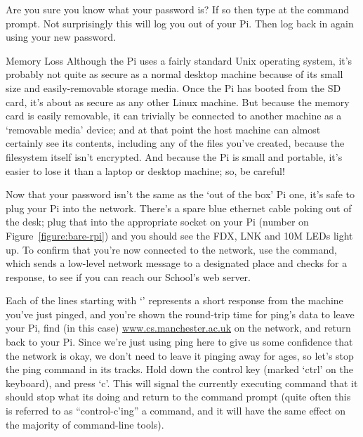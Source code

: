 Are you sure you know what your password is? If so then type  at the command prompt. Not surprisingly this will log you out of your Pi. Then log back in again using your new password. 

\begin{danger}{Memory Loss} 
Although the Pi uses a fairly standard Unix operating system, it's probably not quite as secure as a normal desktop machine because of its small size and easily-removable storage media. Once the Pi has booted from the SD card, it's about as secure as any other Linux machine. But because the memory card is easily removable, it can trivially be connected to another machine as a `removable media' device; and at that point the host machine can almost certainly see its contents, including any of the files you've created, because the filesystem itself isn't encrypted. And because the Pi is small and portable, it's easier to lose it than a laptop or desktop machine; so, be careful!
\end{danger}

Now that your password isn't the same as the `out of the box' Pi one, it's safe to plug your Pi into the network. There's a spare blue ethernet cable poking out of the desk; plug that into the appropriate socket on your Pi (number  on Figure~\ref{figure:bare-rpi}) and you should see the FDX, LNK and 10M LEDs light up. To confirm that you're now connected to the network, use the  command, which sends a low-level network message to a designated place and checks for a response, to see if you can reach our School's web server. 



Each of the lines starting with `' represents a short response from the machine you've just pinged, and you're shown the round-trip time for ping's data to leave your Pi, find (in this case) \url{www.cs.manchester.ac.uk} on the network, and return back to your Pi. Since we're just using ping here to give us some confidence that the network is okay, we don't need to leave it pinging away for ages, so let's stop the ping command in its tracks. Hold down the control key (marked `ctrl' on the keyboard), and press `c'. This will signal the currently executing command that it should stop what its doing and return to the command prompt (quite often this is referred to as ``control-c'ing'' a command, and it will have the same effect on the majority of command-line tools).

